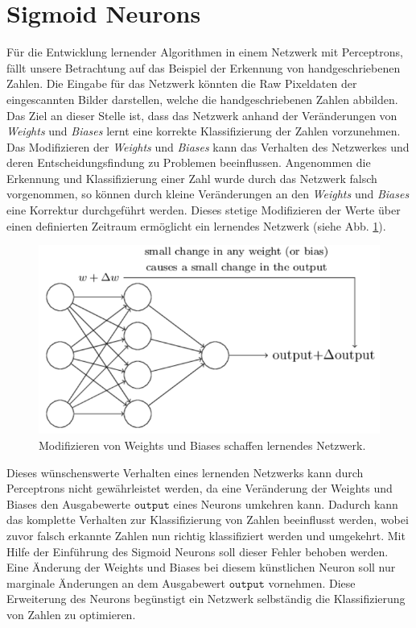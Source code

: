 \section{Sigmoid Neurons}
Für die Entwicklung lernender Algorithmen in einem Netzwerk mit Perceptrons, fällt unsere Betrachtung auf das Beispiel der Erkennung von handgeschriebenen Zahlen. Die Eingabe für das Netzwerk könnten die Raw Pixeldaten der eingescannten Bilder darstellen, welche die handgeschriebenen Zahlen abbilden. Das Ziel an dieser Stelle ist, dass das Netzwerk anhand der Veränderungen von \textit{Weights} und \textit{Biases} lernt eine korrekte Klassifizierung der Zahlen vorzunehmen. \\
Das Modifizieren der \textit{Weights} und \textit{Biases} kann das Verhalten des Netzwerkes und deren Entscheidungsfindung zu Problemen beeinflussen. Angenommen die Erkennung und Klassifizierung einer Zahl wurde durch das Netzwerk falsch vorgenommen, so können durch kleine Veränderungen an den \textit{Weights} und \textit{Biases} eine Korrektur durchgeführt werden. Dieses stetige Modifizieren der Werte über einen definierten Zeitraum ermöglicht ein lernendes Netzwerk (siehe Abb. \ref{fig:sigmoid_learning}). 
\begin{figure}[hbt]
	\centering
	\includegraphics[scale=0.7]{Bilder/sigmoid_learning}
	\caption{Modifizieren von Weights und Biases schaffen lernendes Netzwerk.} 
	\label{fig:sigmoid_learning} 
\end{figure}

\noindent
Dieses wünschenswerte Verhalten eines lernenden Netzwerks kann durch Perceptrons nicht gewährleistet werden, da eine Veränderung der Weights und Biases den Ausgabewerte $\mathtt{output}$ eines Neurons umkehren kann. Dadurch kann das komplette Verhalten zur Klassifizierung von Zahlen beeinflusst werden, wobei zuvor falsch erkannte Zahlen nun richtig klassifiziert werden und umgekehrt. Mit Hilfe der Einführung des Sigmoid Neurons soll dieser Fehler behoben werden. Eine Änderung der Weights und Biases bei diesem künstlichen Neuron soll nur marginale Änderungen an dem Ausgabewert $\mathtt{output}$ vornehmen. Diese Erweiterung des Neurons begünstigt ein Netzwerk selbständig die Klassifizierung von Zahlen zu optimieren. \\

